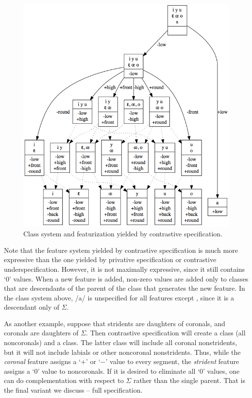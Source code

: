 \documentclass[11pt, oneside]{article}   	%
\begin{document}
\begin{figure}[htb!]
	\centering
	\includegraphics[width=\textwidth]{vowel_inventory_contrastive.png}
	\caption{Class system and featurization yielded by contrastive specification.}
	\label{fig:contrastive}
\end{figure}

Note that the feature system yielded by contrastive specification is much more expressive than the one yielded by privative specification or contrastive underspecification. However, it is not maximally expressive, since it still contains `$0$' values. When a new feature is added, non-zero values are added only to classes that are descendants of the parent of the class that generates the new feature. In the class system above, /a/ is unspecified for all features except , since it is a descendant only of $\Sigma$.

As another example, suppose that stridents are daughters of coronals, and coronals are daughters of $\Sigma$. Then contrastive specification will create a  class (all noncoronals) and a  class. The latter class will include all coronal nonstridents, but it will not include labials or other noncoronal nonstridents. Thus, while the \textit{coronal} feature assigns a `$+$' or `$-$' value to every segment, the \textit{strident} feature assigns a `$0$' value to noncoronals. If it is desired to eliminate all `$0$' values, one can do complementation with respect to $\Sigma$ rather than the single parent. That is the final variant we discuss -- full specification.
\end{document}

